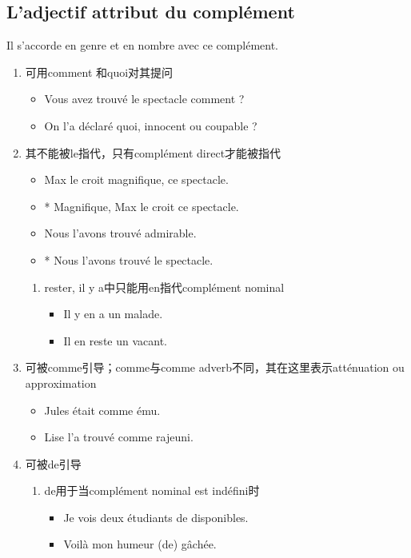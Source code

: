 \documentclass[UTF8]{report}
\begin{document}
\subsection{L’adjectif attribut du complément}
Il s’accorde en genre et en nombre avec ce complément.
\begin{enumerate}
    \item 可用comment 和quoi对其提问
    \begin{itemize}
        \item Vous avez trouvé le spectacle comment ?
        \item On l’a déclaré quoi, innocent ou coupable ?
    \end{itemize}
    \item 其不能被le指代，只有complément direct才能被指代
    \begin{itemize}
        \item Max le croit magnifique, ce spectacle.
        \item * Magnifique, Max le croit ce spectacle.
        \item Nous l’avons trouvé admirable.
        \item * Nous l’avons trouvé le spectacle.
    \end{itemize}
    \begin{enumerate}
        \item rester, il y a中只能用en指代complément nominal
        \begin{itemize}
            \item Il y en a un malade.
            \item Il en reste un vacant.
        \end{itemize}
    \end{enumerate}
    \item 可被comme引导；comme与comme adverb不同，其在这里表示atténuation ou approximation
    \begin{itemize}
        \item Jules était comme ému.
        \item Lise l’a trouvé comme rajeuni.
    \end{itemize}
    \item 可被de引导
    \begin{enumerate}
        \item de用于当complément nominal est indéfini时
        \begin{itemize}
            \item Je vois deux étudiants de disponibles.
            \item Voilà mon humeur (de) gâchée.

\end{itemize}
\end{enumerate}
\end{enumerate}
\end{document}

